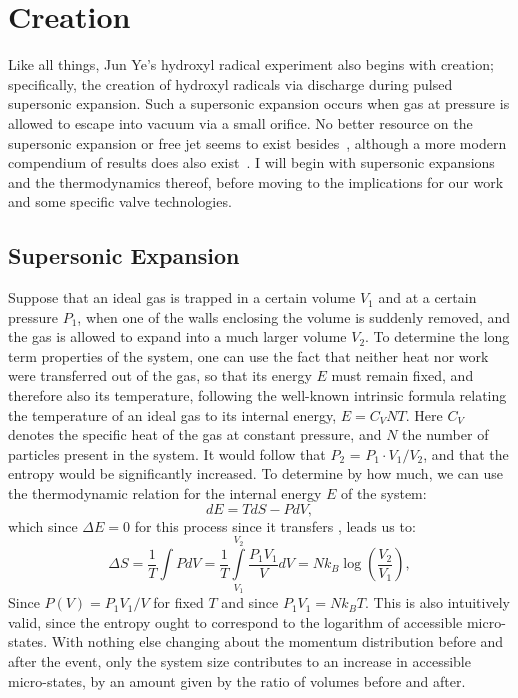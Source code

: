 \ifx\justbeingincluded\undefined


\fi

\chapter{Creation}

Like all things, Jun Ye's hydroxyl radical experiment also begins with creation; specifically, the creation of hydroxyl radicals via discharge during pulsed supersonic expansion. 
Such a supersonic expansion occurs when gas at pressure is allowed to escape into vacuum via a small orifice.
No better resource on the supersonic expansion or free jet seems to exist besides~\cite{Miller1988}, although a more modern compendium of results does also exist~\cite{Campargue2000}.
I will begin with supersonic expansions and the thermodynamics thereof, before moving to the implications for our work and some specific valve technologies.

\section{Supersonic Expansion}\label{secsuperexp}

Suppose that an ideal gas is trapped in a certain volume $V_1$ and at a certain pressure $P_1$, when one of the walls enclosing the volume is suddenly removed, and the gas is allowed to expand into a much larger volume $V_2$.
To determine the long term properties of the system, one can use the fact that neither heat nor work were transferred out of the gas, so that its energy $E$ must remain fixed, and therefore also its temperature, following the well-known intrinsic formula relating the temperature of an ideal gas to its internal energy, $E = C_VNT$.
Here $C_V$ denotes the specific heat of the gas at constant pressure, and $N$ the number of particles present in the system.
It would follow that $P_2$ = $P_1\cdot V_1/V_2$, and that the entropy would be significantly increased.
To determine by how much, we can use the thermodynamic relation for the internal energy $E$ of the system:
\begin{equation}
dE = TdS - PdV,
\end{equation}
which since $\Delta E=0$ for this process since it transfers , leads us to:
\begin{equation}
\Delta S = \frac{1}{T}\int PdV = \frac{1}{T}\int\limits_{V_1}^{V_2}\frac{P_1V_1}{V}dV = Nk_B\log{\left(\frac{V_2}{V_1}\right)},
\end{equation}
Since $P(V) = P_1V_1/V$ for fixed $T$ and since $P_1V_1 = Nk_BT$.
This is also intuitively valid, since the entropy ought to correspond to the logarithm of accessible micro-states.
With nothing else changing about the momentum distribution before and after the event, only the system size contributes to an increase in accessible micro-states, by an amount given by the ratio of volumes before and after.

